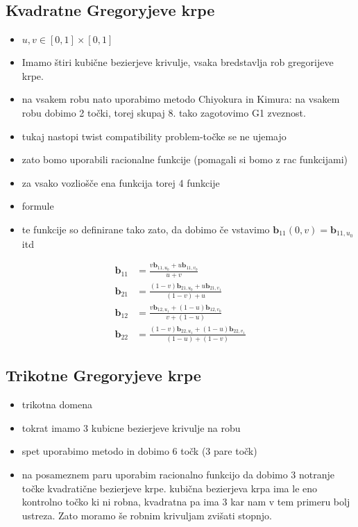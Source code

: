 \documentclass[a4paper,12pt]{article}
\newcommand{\tbf}{\textbf}
\begin{document}
\subsection{Kvadratne Gregoryjeve krpe}

\begin{itemize}
	\item $u,v \in [0,1] \times [0,1]$
	\item Imamo štiri kubične bezierjeve krivulje, vsaka bredstavlja rob gregorijeve krpe.
	\item na vsakem robu nato uporabimo metodo Chiyokura in Kimura: na vsakem robu dobimo 2 točki, torej skupaj $8$. tako zagotovimo G1 zveznost.
	\item tukaj nastopi twist compatibility problem-točke se ne ujemajo
	\item zato bomo uporabili racionalne funkcije (pomagali si bomo z rac funkcijami)
	\item za vsako vozliošče ena funkcija torej 4 funkcije
	\item formule
	\item te funkcije so definirane tako zato, da dobimo če vstavimo $\tbf{b}_{11}(0,v) = \tbf{b}_{11,u_0}$ itd
\end{itemize}

\begin{align*}
\textbf{b}_{11} &=  \frac{v \textbf{b}_{11,u_0}+u\tbf{b}_{11,v_0}}{u +v} \\
\tbf{b}_{21} &= \frac{(1-v) \tbf{b}_{21,u_0}+u\tbf{b}_{21,v_1}}{(1-v)+u} \\
\tbf{b}_{12} &= \frac{v \tbf{b}_{12,u_1}+(1-u)\tbf{b}_{12,v_0}}{v+(1-u)} \\
\tbf{b}_{22} &= \frac{(1-v) \tbf{b}_{22,u_1}+(1-u)\tbf{b}_{22,v_1}}{(1-u)+(1-v)} 
\end{align*}	

\subsection{Trikotne Gregoryjeve krpe}
\begin{itemize}
	\item trikotna domena
	\item tokrat imamo 3 kubicne bezierjeve krivulje na robu
	\item spet uporabimo metodo in dobimo 6 točk (3 pare točk)
	\item na posameznem paru uporabim racionalno funkcijo da dobimo 3 notranje točke kvadratične bezierjeve krpe. kubična bezierjeva krpa ima le eno kontrolno točko ki ni robna, kvadratna pa ima 3 kar nam v tem primeru bolj ustreza. Zato moramo še robnim krivuljam zvišati stopnjo.
\end{itemize}
\end{document}
